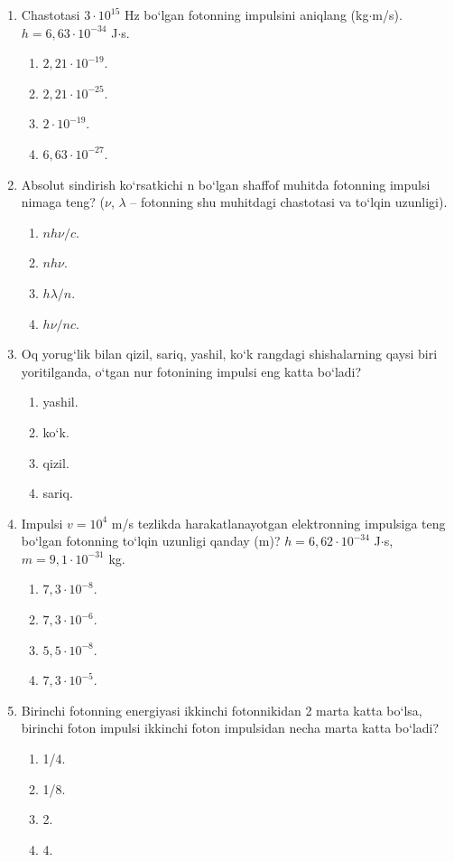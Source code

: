 \begin{enumerate}
\item Chastotasi $3\cdot 10^{15}$ Hz bo‘lgan fotonning impulsini aniqlang (kg$\cdot$m/s). $h = 6,63\cdot 10^{-34}$ J$\cdot$s.
\begin{enumerate}[label=\Alph*)]
\item $2,21\cdot 10^{-19}$.
\item $2,21\cdot 10^{-25}$.
\item $2\cdot 10^{-19}$.
\item $6,63\cdot 10^{-27}$.
\end{enumerate}

\item Absolut sindirish ko‘rsatkichi n bo‘lgan shaffof muhitda fotonning impulsi nimaga teng? ($\nu$, $\lambda$ -- fotonning shu muhitdagi chastotasi va to‘lqin uzunligi).
\begin{enumerate}[label=\Alph*)]
\item $nh\nu/c$.
\item $nh\nu$.
\item $h\lambda/n$.
\item $h\nu/nc$.
\end{enumerate}

\item Oq yorug‘lik bilan qizil, sariq, yashil, ko‘k rangdagi shishalarning qaysi biri yoritilganda, o‘tgan nur fotonining impulsi eng katta bo‘ladi?
\begin{enumerate}[label=\Alph*)]
\item yashil.
\item ko‘k.
\item qizil.
\item sariq.
\end{enumerate}

\item Impulsi $v = 10^4$ m/s tezlikda harakatlanayotgan elektronning impulsiga teng bo‘lgan fotonning to‘lqin uzunligi qanday (m)? $h = 6,62\cdot 10^{-34}$ J$\cdot$s, $m = 9,1\cdot 10^{-31}$ kg.
\begin{enumerate}[label=\Alph*)]
\item $7,3\cdot 10^{-8}$.
\item $7,3\cdot 10^{-6}$.
\item $5,5\cdot 10^{-8}$.
\item $7,3\cdot 10^{-5}$.
\end{enumerate}

\item Birinchi fotonning energiyasi ikkinchi fotonnikidan 2 marta katta bo‘lsa, birinchi foton impulsi ikkinchi foton impulsidan necha marta katta bo‘ladi?
\begin{enumerate}[label=\Alph*)]
\item 1/4.
\item 1/8.
\item 2.
\item 4.
\end{enumerate}


\end{enumerate}
